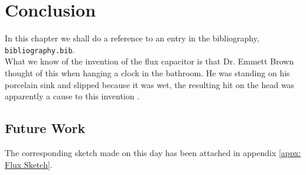 \section{Conclusion}
\label{sec: Reference}

\noindent In this chapter we shall do a reference to an entry in the bibliography, \texttt{bibliography.bib}. \\

What we know of the invention of the flux capacitor is that Dr. Emmett Brown thought of this when hanging a clock in the bathroom. He was standing on his porcelain sink and slipped because it was wet, the resulting hit on the head was apparently a cause to this invention \cite{example}.\\
\subsection{Future Work}
The corresponding sketch made on this day has been attached in appendix \ref{appx: Flux Sketch}.

